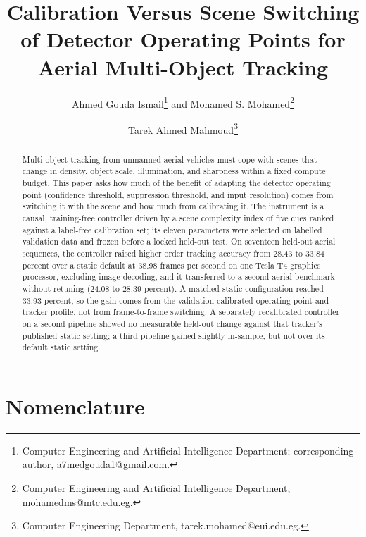 \documentclass[journal]{new-aiaa}
\title{Calibration Versus Scene Switching of Detector Operating Points for Aerial Multi-Object Tracking}
\author{Ahmed Gouda Ismail\footnote{Computer Engineering and Artificial Intelligence Department; corresponding author, a7medgouda1@gmail.com.} and Mohamed S. Mohamed\footnote{Computer Engineering and Artificial Intelligence Department, mohamedms@mtc.edu.eg.}}
\affil{Military Technical College, Cairo, Egypt}
\author{Tarek Ahmed Mahmoud\footnote{Computer Engineering Department, tarek.mohamed@eui.edu.eg.}}
\affil{Egypt University of Informatics, Cairo, Egypt}
\begin{document}
\maketitle

\begin{abstract}
Multi-object tracking from unmanned aerial vehicles must cope with scenes that change in density, object scale, illumination, and sharpness within a fixed compute budget. This paper asks how much of the benefit of adapting the detector operating point (confidence threshold, suppression threshold, and input resolution) comes from switching it with the scene and how much from calibrating it. The instrument is a causal, training-free controller driven by a scene complexity index of five cues ranked against a label-free calibration set; its eleven parameters were selected on labelled validation data and frozen before a locked held-out test. On seventeen held-out aerial sequences, the controller raised higher order tracking accuracy from 28.43 to 33.84 percent over a static default at 38.98 frames per second on one Tesla T4 graphics processor, excluding image decoding, and it transferred to a second aerial benchmark without retuning (24.08 to 28.39 percent). A matched static configuration reached 33.93 percent, so the gain comes from the validation-calibrated operating point and tracker profile, not from frame-to-frame switching. A separately recalibrated controller on a second pipeline showed no measurable held-out change against that tracker's published static setting; a third pipeline gained slightly in-sample, but not over its default static setting.
\end{abstract}

\section*{Nomenclature}
\end{document}
